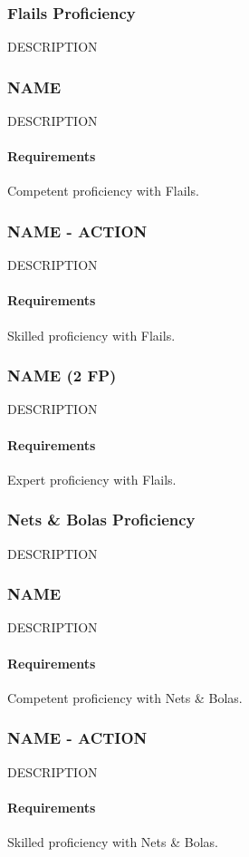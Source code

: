 \subsubsection{Flails Proficiency} \label{feat::name}
    DESCRIPTION
\subsubsection{NAME} \label{feat::name}
    DESCRIPTION
    \paragraph{Requirements} Competent proficiency with Flails.
\subsubsection{NAME - ACTION} \label{feat::name}
    DESCRIPTION
    \paragraph{Requirements} Skilled proficiency with Flails.
\subsubsection{NAME (2 FP)} \label{feat::name}
    DESCRIPTION
    \paragraph{Requirements} Expert proficiency with Flails.
\subsubsection{Nets \& Bolas Proficiency} \label{feat::name}
    DESCRIPTION
\subsubsection{NAME} \label{feat::name}
    DESCRIPTION
    \paragraph{Requirements} Competent proficiency with Nets \& Bolas.
\subsubsection{NAME - ACTION} \label{feat::name}
    DESCRIPTION
    \paragraph{Requirements} Skilled proficiency with Nets \& Bolas.
